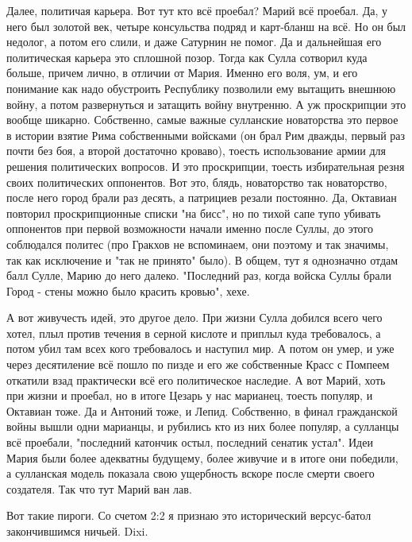 Далее, политичая карьера. Вот тут кто всё проебал? Марий всё проебал. Да, у него был золотой век, четыре консульства подряд и карт-бланш на всё. Но он был недолог, а потом его слили, и даже Сатурнин не помог. Да и дальнейшая его политическая карьера это сплошной позор. Тогда как Сулла сотворил куда больше, причем лично, в отличии от Мария. Именно его воля, ум, и его понимание как надо обустроить Республику позволили ему вытащить внешнюю войну, а потом развернуться и затащить войну внутренню. А уж проскрипции это вообще шикарно. Собственно, самые важные сулланские новаторства это первое в истории взятие Рима собственными войсками (он брал Рим дважды, первый раз почти без боя, а второй достаточно кроваво), тоесть использование армии для решения политических вопросов. И это проскрипции, тоесть избирательная резня своих политических оппонентов. Вот это, блядь, новаторство так новаторство, после него город брали раз десять, а патрициев резали постоянно. Да, Октавиан повторил проскрипционные списки "на бисс", но по тихой сапе тупо убивать оппонентов при первой возможности начали именно после Суллы, до этого соблюдался политес (про Гракхов не вспоминаем, они поэтому и так значимы, так как исключение и "так не принято" было). В общем, тут я однозначно отдам балл Сулле, Марию до него далеко. "Последний раз, когда войска Суллы брали Город - стены можно было красить кровью", хехе.


А вот живучесть идей, это другое дело. При жизни Сулла добился всего чего хотел, плыл против течения в серной кислоте и приплыл куда требовалось, а потом убил там всех кого требовалось и наступил мир. А потом он умер, и уже через десятиление всё пошло по пизде и его же собственные Красс с Помпеем откатили взад практически всё его политическое наследие. А вот Марий, хоть при жизни и проебал, но в итоге Цезарь у нас марианец, тоесть популяр, и Октавиан тоже. Да и Антоний тоже, и Лепид. Собственно, в финал гражданской войны вышли одни марианцы, и рубились кто из них более популяр, а сулланцы всё проебали, "последний катончик остыл, последний сенатик устал". Идеи Мария были более адекватны будущему, более живучие и в итоге они победили, а сулланская модель показала свою ущербность вскоре после смерти своего создателя. Так что тут Марий ван лав.


Вот такие пироги. Со счетом 2:2 я признаю это исторический версус-батол закончившимся ничьей. Dixi.



